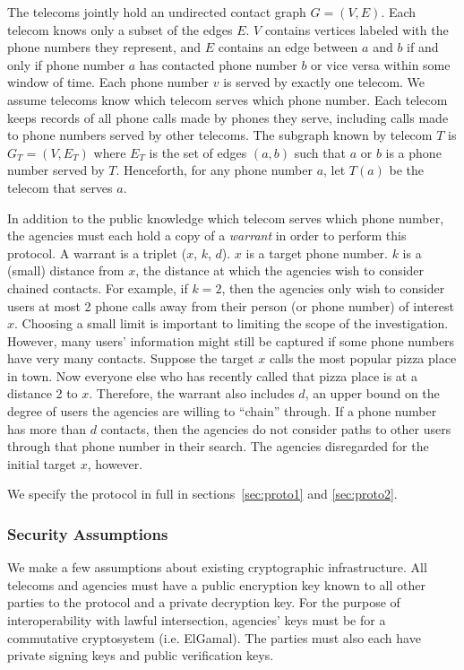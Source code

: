 The telecoms jointly hold an undirected contact graph $G=(V,E)$. Each telecom knows only a subset of the edges $E$. $V$ contains vertices labeled with the phone numbers they represent, and $E$ contains an edge between $a$ and $b$ if and only if phone number $a$ has contacted phone number $b$ or vice versa within some window of time. Each phone number $v$ is served by exactly one telecom. We assume telecoms know which telecom serves which phone number. Each telecom keeps records of all phone calls made by phones they serve, including calls made to phone numbers served by other telecoms. The subgraph known by telecom $T$ is $G_T=(V, E_T)$ where $E_T$ is the set of edges $(a, b)$ such that $a$ or $b$ is a phone number served by $T$. Henceforth, for any phone number $a$, let $T(a)$ be the telecom that serves $a$.



In addition to the public knowledge which telecom serves which phone number, the agencies must each hold a copy of a \emph{warrant} in order to perform this protocol. A warrant is a triplet ($x$, $k$, $d$). $x$ is a target phone number. $k$ is a (small) distance from $x$, the distance at which the agencies wish to consider chained contacts. For example, if $k=2$, then the agencies only wish to consider users at most 2 phone calls away from their person (or phone number) of interest $x$. Choosing a small limit is important to limiting the scope of the investigation. However, many users' information might still be captured if some phone numbers have very many contacts. Suppose the target $x$ calls the most popular pizza place in town. Now everyone else who has recently called that pizza place is at a distance 2 to $x$. Therefore, the warrant also includes $d$, an upper bound on the degree of users the agencies are willing to ``chain'' through. If a phone number has more than $d$ contacts, then the agencies do not consider paths to other users through that phone number in their search. The agencies disregarded for the initial target $x$, however.



We specify the protocol in full in sections~\ref{sec:proto1} and \ref{sec:proto2}.



\subsubsection{Security Assumptions}



We make a few assumptions about existing cryptographic infrastructure. All telecoms and agencies must have a public encryption key known to all other parties to the protocol and a private decryption key. For the purpose of interoperability with lawful intersection, agencies' keys must be for a commutative cryptosystem (i.e. ElGamal). The parties must also each have private signing keys and public verification keys.



